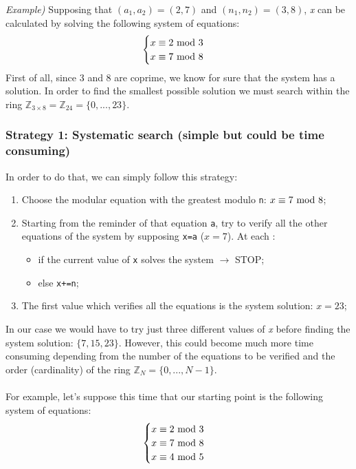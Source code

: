 \newpage
\hfill\break
\textit{Example)} Supposing that $(a_1,a_2)=(2,7)$ and $(n_1,n_2)=(3,8)$, \textit{x} can be calculated by solving the following system of equations:
\begin{equation*}
    \begin{cases}
        x\equiv2\text{ mod }3\\
        x\equiv7\text{ mod }8
    \end{cases}
\end{equation*}
First of all, since 3 and 8 are coprime, we know for sure that the system has a solution. In order to find the smallest possible solution we must search within the ring $\mathbb{Z}_{3\times8}=\mathbb{Z}_{24}=\{0,...,23\}$.
\subsubsection*{Strategy 1: Systematic search (simple but could be time consuming)}
In order to do that, we can simply follow this strategy:
\begin{enumerate}
    \item Choose the modular equation with the greatest modulo \texttt{n}: $x\equiv7\text{ mod }8$;
    \item Starting from the reminder of that equation \texttt{a}, try to verify all the other equations of the system by supposing \texttt{x=a} ($x=7$). At each :
    \begin{itemize}
        \item if the current value of \texttt{x} solves the system $\rightarrow$ STOP;
        \item else \texttt{x+=n};
    \end{itemize}
    \item The first value which verifies all the equations is the system solution: $x=23$;
\end{enumerate}
In our case we would have to try just three different values of \textit{x} before finding the system solution: $\{7,15,23\}$. However, this could become much more time consuming depending from the number of the equations to be verified and the order (cardinality) of the ring $\mathbb{Z}_N=\{0,...,N-1\}$.\\\\
For example, let's suppose this time that our starting point is the following system of equations:
\begin{equation*}
    \begin{cases}
        x\equiv2\text{ mod }3\\
        x\equiv7\text{ mod }8\\
        x\equiv4\text{ mod }5
    \end{cases}
\end{equation*}
